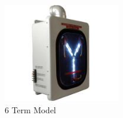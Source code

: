 \begin{figure}
\includegraphics[keepaspectratio=true,width=2in]{./figures/modeling/fullModel.jpg}
\centering
\caption{6 Term Model}
\label{fig:fullModel}
\end{figure}
